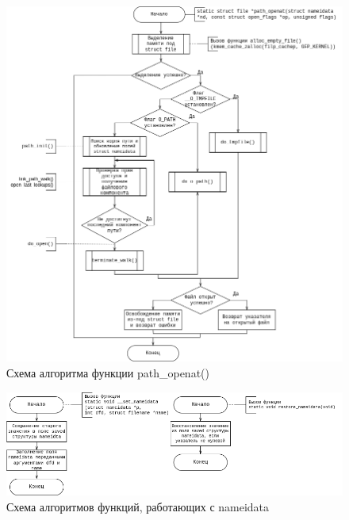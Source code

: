 \begin{figure}[H]
	\centering
	\includegraphics[scale=0.52]{assets/flowchart-openat.drawio.png}
	\caption{Схема алгоритма функции path\_openat()}
\end{figure}

\begin{figure}[H]
	\centering
	\includegraphics[scale=0.6]{assets/flowchart-nameidata.drawio.png}
	\caption{Схема алгоритмов функций, работающих с nameidata}
\end{figure}

